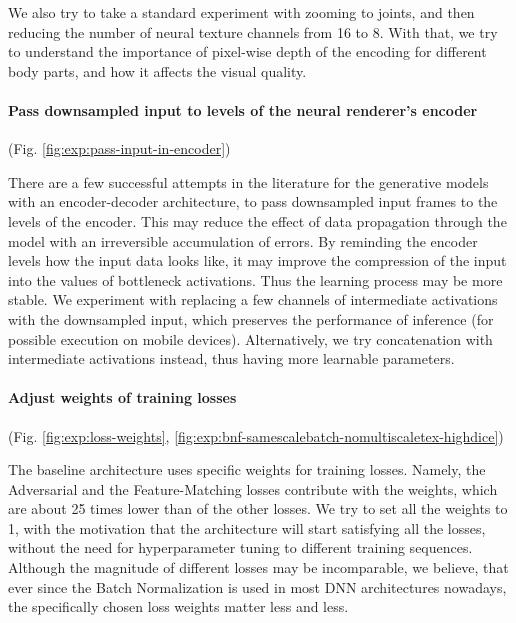 We also try to take a standard experiment with zooming to joints, and then reducing the number of neural texture channels from 16 to 8. With that, we try to understand the importance of pixel-wise depth of the encoding for different body parts, and how it affects the visual quality.

\vspace{-15pt}\paragraph{Pass downsampled input to levels of the neural renderer's encoder}(Fig. \ref{fig:exp:pass-input-in-encoder})\mbox{}\nopagebreak

There are a few successful attempts in the literature \cite{dnn:relightable-pointcloud20, dnn:neuralpointgraphics20} for the generative models with an encoder-decoder architecture, to pass downsampled input frames to the levels of the encoder. This may reduce the effect of data propagation through the model with an irreversible accumulation of errors. By reminding the encoder levels how the input data looks like, it may improve the compression of the input into the values of bottleneck activations. Thus the learning process may be more stable. We experiment with replacing a few channels of intermediate activations with the downsampled input, which preserves the performance of inference (for possible execution on mobile devices). Alternatively, we try concatenation with intermediate activations instead, thus having more learnable parameters.


\vspace{-15pt}\paragraph{Adjust weights of training losses}(Fig. \ref{fig:exp:loss-weights}, \ref{fig:exp:bnf-samescalebatch-nomultiscaletex-highdice})\mbox{}\nopagebreak

The baseline architecture uses specific weights for training losses. Namely, the Adversarial and the Feature-Matching losses contribute with the weights, which are about 25 times lower than of the other losses. We try to set all the weights to 1, with the motivation that the architecture will start satisfying all the losses, without the need for hyperparameter tuning to different training sequences. Although the magnitude of different losses may be incomparable, we believe, that ever since the Batch Normalization is used in most DNN architectures nowadays, the specifically chosen loss weights matter less and less. 

